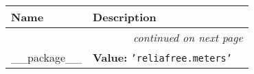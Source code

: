     \vspace{-1cm}
\hspace{\varindent}\begin{longtable}{|p{\varnamewidth}|p{\vardescrwidth}|l}
\cline{1-2}
\cline{1-2} \centering \textbf{Name} & \centering \textbf{Description}& \\
\cline{1-2}
\endhead\cline{1-2}\multicolumn{3}{r}{\small\textit{continued on next page}}\\\endfoot\cline{1-2}
\endlastfoot\raggedright \_\-\_\-p\-a\-c\-k\-a\-g\-e\-\_\-\_\- & \raggedright \textbf{Value:} 
{\tt \texttt{'}\texttt{reliafree.meters}\texttt{'}}&\\
\cline{1-2}
\end{longtable}

